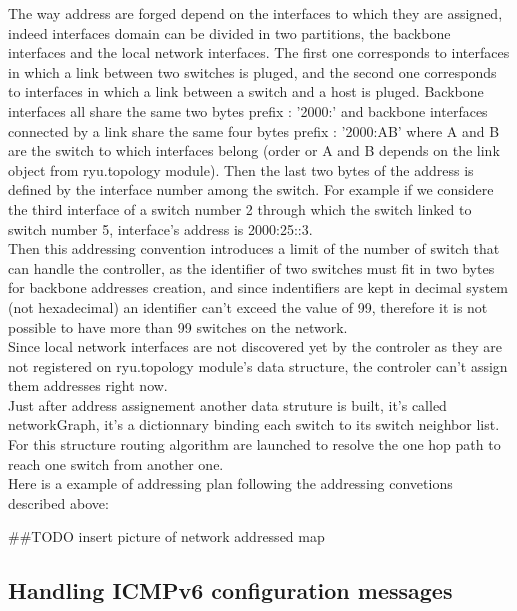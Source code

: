 \documentclass{article}
\begin{document}
The way address are forged depend on the interfaces to which they are
assigned, indeed interfaces domain can be divided in two partitions,
the backbone interfaces and the local network interfaces. The first
one corresponds to interfaces in which a link between two switches is
pluged, and the second one corresponds to interfaces in which a link
between a switch and a host is pluged. Backbone interfaces all share
the same two bytes prefix : '2000:' and backbone interfaces connected
by a link share the same four bytes prefix : '2000:AB' where A and B
are the switch to which interfaces belong (order or A and B depends on
the link object from ryu.topology module). Then the last two bytes of
the address is defined by the interface number among the switch. For
example if we considere the third interface of a switch number 2
through which the switch linked to switch number 5, interface's address 
is 2000:25::3.\\
\newline
Then this addressing convention introduces a limit of the number of
switch that can handle the controller, as the identifier of two
switches must fit in two bytes for backbone addresses creation, and
since indentifiers are kept in decimal system (not hexadecimal) an
identifier can't exceed the value of 99, therefore it is not possible
to have more than 99 switches on the network.\\
\newline
Since local network interfaces are not discovered yet by the controler
as they are not registered on ryu.topology module's data structure,
the controler can't assign them addresses right now.\\
\newline
Just after address assignement another data struture is built, it's
called networkGraph, it's a dictionnary binding each switch to its
switch neighbor list. For this structure routing algorithm are
launched to resolve the one hop path to reach one switch from another
one.\\
\newline
Here is a example of addressing plan following the addressing
convetions described above:

##TODO insert picture of network addressed map

\subsection{Handling ICMPv6 configuration messages}
\end{document}
